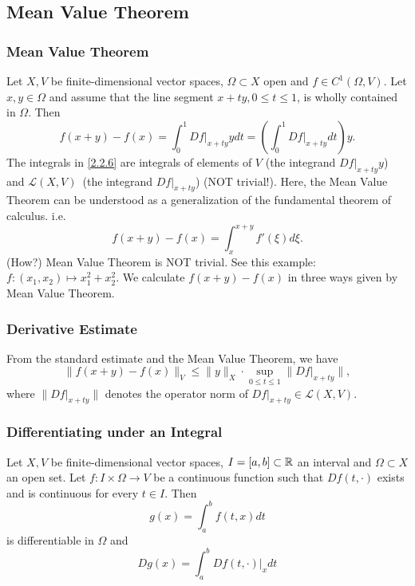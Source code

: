 \documentclass[12pt, t]{beamer}
\begin{document}
\subsection{Mean Value Theorem}
\begin{frame}[allowframebreaks]
    \frametitle{Mean Value Theorem}
    Let $X,V$ be finite-dimensional vector spaces, $\Omega\subset X$ open and $f\in C^1(\Omega,V)$. Let $x,y\in\Omega$ and assume that the line segment $x+ty,0\leq t\leq 1$, is wholly contained in $\Omega$. Then
    \begin{equation}\label{2.2.6}
        f(x+y)-f(x)=\int_{0}^{1}Df|_{x+ty}ydt=\left(\int_{0}^{1}Df|_{x+ty}dt\right)y.
    \end{equation}
    The integrals in \eqref{2.2.6} are integrals of elements of $V$ (the integrand $Df|_{x+ty}y$) and $\mathcal{L}(X,V)$~(the integrand $Df|_{x+ty}$) (NOT trivial!). Here, the Mean Value Theorem can be understood as a generalization of the fundamental theorem of calculus. i.e.
    \[f(x+y)-f(x)=\int_{x}^{x+y}f'(\xi)d\xi.\]
    (How?)
    \newpage
    Mean Value Theorem is NOT trivial. See this example: $f: (x_1,x_2)\mapsto x_1^2+x_2^2$. We calculate $f(x+y)-f(x)$ in three ways given by Mean Value Theorem.

\end{frame}

\begin{frame}
    \frametitle{Derivative Estimate}
    From the standard estimate and the Mean Value Theorem, we have
    \[\|f(x+y)-f(x)\|_V\leq\|y\|_X\cdot\sup_{0\leq t\leq 1}\|Df|_{x+ty}\|,\]
    where $\|Df|_{x+ty}\|$ denotes the operator norm of $Df|_{x+ty}\in\mathcal{L}(X,V)$.
\end{frame}

\begin{frame}
    \frametitle{Differentiating under an Integral}
    Let $X,V$ be finite-dimensional vector spaces, $I=[a,b]\subset\mathbb{R}$ an interval and $\Omega\subset X$ an open set. Let $f:I\times\Omega\to V$ be a continuous function such that $Df(t,\cdot)$ exists and is continuous for every $t\in I$. Then
    \[g(x)=\int_{a}^{b}f(t,x)dt\]
    is differentiable in $\Omega$ and
    \[Dg(x)=\int_{a}^{b}Df(t,\cdot)|_xdt\]
\end{frame}
\end{document}
